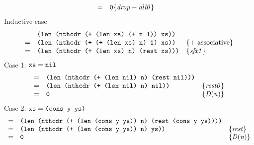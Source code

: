 \documentclass[fleqn]{article}
\newenvironment{proof}
  {\[\begin{array}{lll}}
  {\end{array}\]}
\newcommand{\law}[1]{\{\mathit{#1}\}}
\renewcommand{\c}[1]{\mbox{\texttt{#1}}}
\begin{document}
\begin{enumerate}
\begin{proof}
        = & \c{0} \law{drop-all0} & \\
      \end{proof}
      Inductive case
      \begin{proof}
          & \c{(len (nthcdr (+ (len xs) (+ n 1)) xs))} & \\
        = & \c{(len (nthcdr (+ (+ (len xs) n) 1) xs))} & \law{+\ \mathrm{associative}} \\
        = & \c{(len (nthcdr (+ (len xs) n) (rest xs)))} & \law{sfx1} \\
      \end{proof}
      Case 1: $\c{xs} = \c{nil}$
      \begin{proof}
        = & \c{(len (nthcdr (+ (len nil) n) (rest nil)))} & \\
        = & \c{(len (nthcdr (+ (len nil) n) nil))} & \law{rest0} \\
        = & \c{0} & \law{D(n)} \\
      \end{proof}
      Case 2: $\c{xs} = \c{(cons y ys)}$
      \begin{proof}
        = & \c{(len (nthcdr (+ (len (cons y ys)) n) (rest (cons y ys))))} & \\
        = & \c{(len (nthcdr (+ (len (cons y ys)) n) ys))} & \law{rest} \\
        = & \c{0} & \law{D(n)} \\
      \end{proof}
  \end{enumerate}
\end{document}
